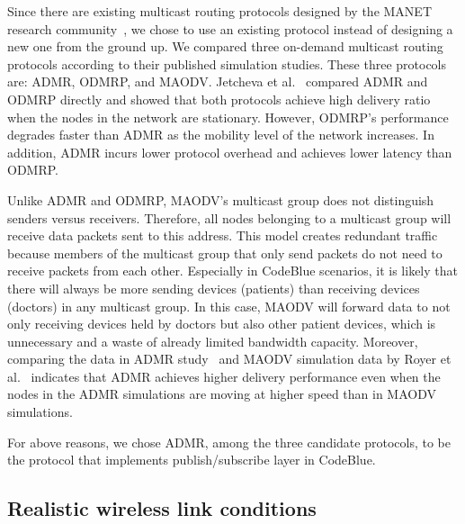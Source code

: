 Since there are existing multicast routing protocols designed by the MANET
research community~\cite{admr, maodv, odmrp}, we chose to use an existing
protocol instead of designing a new one from the ground up. We compared
three on-demand multicast routing protocols according to their published
simulation studies. These three protocols are: ADMR, ODMRP, and MAODV.
Jetcheva et al.~\cite{admr} compared ADMR and ODMRP directly and showed that both
protocols achieve high delivery ratio when the nodes in the network are
stationary. However, ODMRP's performance degrades faster than ADMR as the
mobility level of the network increases. In addition, ADMR incurs lower
protocol overhead and achieves lower latency than ODMRP. 

Unlike ADMR and ODMRP, MAODV's multicast group does not distinguish senders
versus receivers. Therefore, all nodes belonging to a multicast group will
receive data packets sent to this address. This model creates redundant
traffic because members of the multicast group that only send packets do not
need to receive packets from each other. Especially in CodeBlue scenarios, it
is likely that there will always be more sending devices (patients) than
receiving devices (doctors) in any multicast group. In this case, MAODV will
forward data to not only receiving devices held by doctors but also other
patient devices, which is unnecessary and a waste of already limited bandwidth
capacity. Moreover, comparing the data in ADMR study~\cite{admr} and MAODV
simulation data by Royer et al.~\cite{maodv} indicates that ADMR achieves
higher delivery performance even when the nodes in the ADMR simulations are
moving at higher speed than in MAODV simulations.

For above reasons, we chose ADMR, among the three candidate
protocols, to be the protocol that implements publish/subscribe layer in
CodeBlue. 

\subsection{Realistic wireless link conditions}

